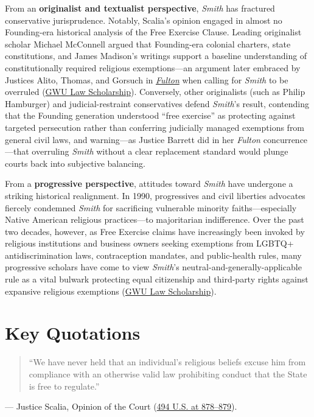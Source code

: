 \documentclass[12pt]{article}
\begin{document}
From an \textbf{originalist and textualist perspective}, \textit{Smith} has fractured conservative jurisprudence. Notably, Scalia's opinion engaged in almost no Founding-era historical analysis of the Free Exercise Clause. Leading originalist scholar Michael McConnell argued that Founding-era colonial charters, state constitutions, and James Madison's writings support a baseline understanding of constitutionally required religious exemptions---an argument later embraced by Justices Alito, Thomas, and Gorsuch in \href{https://www.oyez.org/cases/2020/19-123}{\textit{Fulton}} when calling for \textit{Smith} to be overruled (\href{https://scholarship.law.gwu.edu/cgi/viewcontent.cgi?article=2806&context=faculty_publications}{GWU Law Scholarship}). Conversely, other originalists (such as Philip Hamburger) and judicial-restraint conservatives defend \textit{Smith}'s result, contending that the Founding generation understood ``free exercise'' as protecting against targeted persecution rather than conferring judicially managed exemptions from general civil laws, and warning---as Justice Barrett did in her \textit{Fulton} concurrence---that overruling \textit{Smith} without a clear replacement standard would plunge courts back into subjective balancing.

From a \textbf{progressive perspective}, attitudes toward \textit{Smith} have undergone a striking historical realignment. In 1990, progressives and civil liberties advocates fiercely condemned \textit{Smith} for sacrificing vulnerable minority faiths---especially Native American religious practices---to majoritarian indifference. Over the past two decades, however, as Free Exercise claims have increasingly been invoked by religious institutions and business owners seeking exemptions from LGBTQ+ antidiscrimination laws, contraception mandates, and public-health rules, many progressive scholars have come to view \textit{Smith}'s neutral-and-generally-applicable rule as a vital bulwark protecting equal citizenship and third-party rights against expansive religious exemptions (\href{https://scholarship.law.gwu.edu/cgi/viewcontent.cgi?article=2806&context=faculty_publications}{GWU Law Scholarship}).

\section{Key Quotations}

\begin{quote}
``We have never held that an individual's religious beliefs excuse him from compliance with an otherwise valid law prohibiting conduct that the State is free to regulate.''
\end{quote}
\noindent --- Justice Scalia, Opinion of the Court (\href{https://supreme.justia.com/cases/federal/us/494/872/}{494 U.S. at 878--879}).
\end{document}
